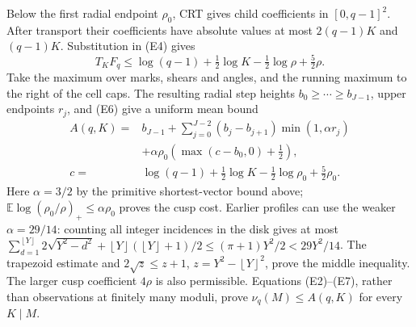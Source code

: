 \documentclass[11pt]{article}
\theoremstyle{definition}\newtheorem{definition}[theorem]{Definition}
\theoremstyle{remark}\newtheorem{remark}[theorem]{Remark}
\newcommand{\floor}[1]{\left\lfloor #1\right\rfloor}
\begin{document}
Below the first radial endpoint \(\rho_0\), CRT gives child coefficients
in \([0,q-1]^2\). After transport their coefficients have absolute
values at most \(2(q-1)K\) and \((q-1)K\). Substitution in (E4) gives
\[
 T_KF_q\le\log(q-1)+\tfrac12\log K-\tfrac12\log\rho+\tfrac52\rho.
                                                                    \tag{E6}
\]
Take the maximum over marks, shears and angles, and the running maximum
to the right of the cell caps. The resulting radial step heights
\(b_0\ge\cdots\ge b_{J-1}\), upper endpoints \(r_j\), and (E6) give
a uniform mean bound
\[
\begin{split}
 A(q,K)={}&b_{J-1}+\sum_{j=0}^{J-2}(b_j-b_{j+1})\min(1,\alpha r_j)\\
 &+\alpha\rho_0\left(\max(c-b_0,0)+\tfrac12\right),\\
 c={}&\log(q-1)+\tfrac12\log K-\tfrac12\log\rho_0+\tfrac52\rho_0 .
\end{split}                                                        \tag{E7}
\]
Here \(\alpha=3/2\) by the primitive shortest-vector bound above;
\(\mathbb E\log(\rho_0/\rho)_+\le\alpha\rho_0\) proves the cusp cost.
Earlier profiles can use the weaker \(\alpha=29/14\): counting all
integer incidences in the disk gives at most
\(\sum_{d=1}^{\floor Y}2\sqrt{Y^2-d^2}
 +\floor Y(\floor Y+1)/2\le(\pi+1)Y^2/2<29Y^2/14\).
The trapezoid estimate and \(2\sqrt z\le z+1\),
\(z=Y^2-\floor Y^2\), prove the middle inequality.
The larger cusp coefficient \(4\rho\) is also permissible.
Equations (E2)--(E7), rather than observations at finitely many moduli,
prove \(\nu_q(M)\le A(q,K)\) for every \(K\mid M\).
\end{document}
